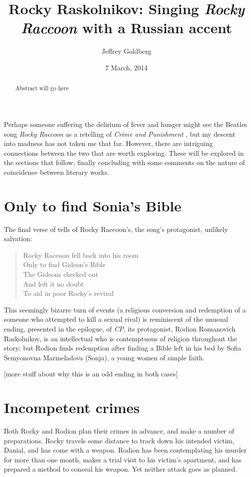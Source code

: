 \documentclass[ib]{mlaresearch}
\title{Rocky Raskolnikov: Singing \textit{Rocky Raccoon} with a Russian accent}
\author{Jeffrey Goldberg}
\date{7 March, 2014}
\begin{document}
\makeIBtitle

\frontmatter
\clearpage
\begin{abstract}
Abstract will go here
\end{abstract}
\clearpage
\tableofcontents
\mainmatter


Perhaps someone suffering the delirium of fever and hunger might see the
Beatles song \textit{Rocky Raccoon} \autocite{Beatles:RR} as a retelling of
\textit{Crime and Punishment} \autocite{Dostoyevsky:CP}, but my descent into
madness has not taken me that far. However, there are intriguing connections
between the two that are worth exploring. These will be explored in the
sections that follow, finally concluding with some comments on the nature of
coincidence between literary works.

\section{Only to find Sonia's Bible}

The final verse of \autocite{Beatles:RR} tells of Rocky Raccoon's, the song's protagonist, unlikely salvation:

\begin{verse}
Rocky Raccoon fell back into his room\\
Only to find Gideon's Bible\\
The Gideons checked out\\
And left it no doubt\\
To aid in poor Rocky's revival
\end{verse}

This seemingly bizarre turn of events (a religious conversion and redemption
of a someone who attempted to kill a sexual rival) is reminiscent of the
unusual ending, presented in the epilogue, of \textit{CP}, its protagonist,
Rodion Romanovich Raskolnikov, is an intellectual who is contemptuous of
religion throughout the story; but Rodion finds redemption after finding a
Bible left in his bed by Sofia Semyonovna Marmeladova (Sonja), a young women
of simple faith.

[more stuff about why this is an odd ending in both cases]

\section{Incompetent crimes}

Both Rocky and Rodion plan their crimes in advance, and make a number of preparations. Rocky travels some distance to track down his intended victim, Danial, and has come with a weapon. Rodion has been contemplating his murder for more than one month, makes a trial visit to his victim's apartment, and has prepared a method to conceal his weapon. Yet neither attack goes as planned.
\end{document}
